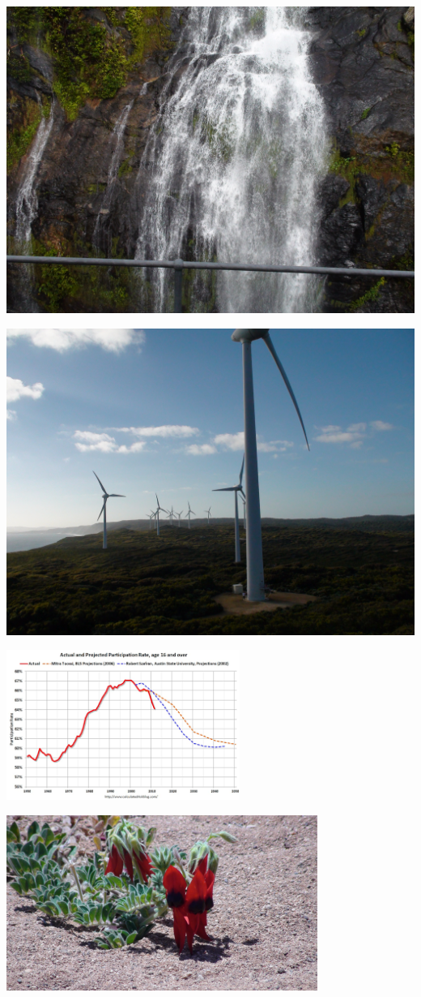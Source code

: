 \documentclass[12pt]{article}
\begin{document}
\begin{flushright}
\includegraphics[scale=0.07]{waterfall}
\end{flushright}

\begin{flushleft}
\includegraphics[scale=0.07]{windmill}
\end{flushleft}

\includegraphics[width=3in]{graph}

\includegraphics[angle=45,width=4in]{flower}
\end{document}
